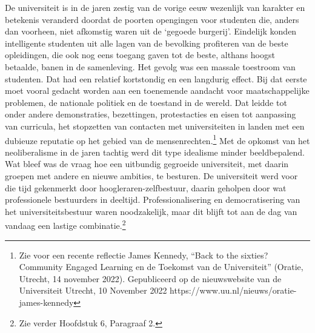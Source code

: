 \documentclass{jote-book}
\begin{document}
	De universiteit is in de jaren zestig van de vorige eeuw wezenlijk van karakter en betekenis veranderd doordat de poorten opengingen voor studenten die, anders dan voorheen, niet afkomstig waren uit de ‘gegoede burgerij'. Eindelijk konden intelligente studenten uit alle lagen van de bevolking profiteren van de beste opleidingen, die ook nog eens toegang gaven tot de beste, althans hoogst betaalde, banen in de samenleving. Het gevolg was een massale toestroom van studenten. Dat had een relatief kortstondig en een langdurig effect. Bij dat eerste moet vooral gedacht worden aan een toenemende aandacht voor maatschappelijke problemen, de nationale politiek en de toestand in de wereld. Dat leidde tot onder andere demonstraties, bezettingen, protestacties en eisen tot aanpassing van curricula, het stopzetten van contacten met universiteiten in landen met een dubieuze reputatie op het gebied van de mensenrechten.\footnote{Zie voor een recente reflectie James Kennedy, “Back to the sixties? Community Engaged Learning en de Toekomst van de Universiteit” (Oratie, Utrecht, 14 november 2022). Gepubliceerd op de nieuwswebsite van de Universiteit Utrecht, 10 November 2022 https://www.uu.nl/nieuws/oratie-james-kennedy } Met de opkomst van het neoliberalisme in de jaren tachtig werd dit type idealisme minder beeldbepalend. Wat bleef was de vraag hoe een uitbundig gegroeide universiteit, met daarin groepen met andere en nieuwe ambities, te besturen. De universiteit werd voor die tijd gekenmerkt door hoogleraren-zelfbestuur, daarin geholpen door wat professionele bestuurders in deeltijd. Professionalisering en democratisering van het universiteitsbestuur waren noodzakelijk, maar dit blijft tot aan de dag van vandaag een lastige combinatie.\footnote{Zie verder Hoofdstuk 6, Paragraaf 2.}
\end{document}

